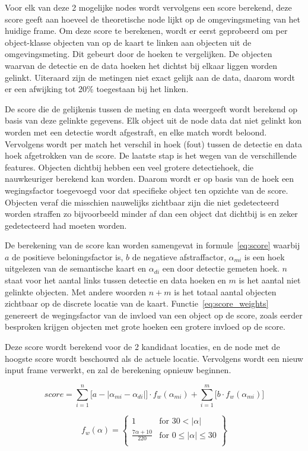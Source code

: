 Voor elk van deze 2 mogelijke nodes wordt vervolgens een score berekend, deze score geeft aan hoeveel de theoretische node lijkt op de omgevingsmeting van het huidige frame.
Om deze score te berekenen, wordt er eerst geprobeerd om per object-klasse objecten van op de kaart te linken aan objecten uit de omgevingsmeting.
Dit gebeurt door de hoeken te vergelijken.
De objecten waarvan de detectie en de data hoeken het dichtst bij elkaar liggen worden gelinkt.
Uiteraard zijn de metingen niet exact gelijk aan de data, daarom wordt er een afwijking tot 20\% toegestaan bij het linken.

De score die de gelijkenis tussen de meting en data weergeeft wordt berekend op basis van deze gelinkte gegevens.
Elk object uit de node data dat niet gelinkt kon worden met een detectie wordt afgestraft, en elke match wordt beloond.
Vervolgens wordt per match het verschil in hoek (fout) tussen de detectie en data hoek afgetrokken van de score.
De laatste stap is het wegen van de verschillende features. Objecten dichtbij hebben een veel grotere detectiehoek, die nauwkeuriger berekend kan worden.
Daarom wordt er op basis van de hoek een wegingsfactor toegevoegd voor dat specifieke object ten opzichte van de score.
Objecten veraf die misschien nauwelijks zichtbaar zijn die niet gedetecteerd worden straffen zo bijvoorbeeld minder af dan een object dat dichtbij is en zeker gedetecteerd had moeten worden.

De berekening van de score kan worden samengevat in formule~\ref{eq:score} waarbij $a$ de positieve beloningsfactor is, $b$ de negatieve afstraffactor,
$\alpha_{mi}$ is een hoek uitgelezen van de semantische kaart en $\alpha_{di}$ een door detectie gemeten hoek.
$n$ staat voor het aantal links tussen detectie en data hoeken en $m$ is het aantal niet gelinkte objecten.
Met andere woorden $n + m$ is het totaal aantal objecten zichtbaar op de discrete locatie van de kaart.
Functie~\ref{eq:score_weights} genereert de wegingsfactor van de invloed van een object op de score, zoals eerder besproken krijgen objecten met grote hoeken
een grotere invloed op de score.

Deze score wordt berekend voor de 2 kandidaat locaties, en de node met de hoogste score wordt beschouwd als de actuele locatie.
Vervolgens wordt een nieuw input frame verwerkt, en zal de berekening opnieuw beginnen.

\begin{equation}\label{eq:score}
    score = \sum_{i=1}^{n}\big[a - |\alpha_{mi} - \alpha_{di}|\big] \cdot f_w(\alpha_{mi}) + \sum_{i=1}^{m}\big[b \cdot f_w(\alpha_{mi})\big]
\end{equation}

\begin{equation}\label{eq:score_weights}
    f_w(\alpha) = \left\{\begin{array}{lr}
                1 & \text{for } 30 < |\alpha|\\
                \frac{7\alpha + 10}{220} & \text{for } 0 \leq |\alpha| \leq 30\\
    \end{array}
    \right\}
\end{equation}